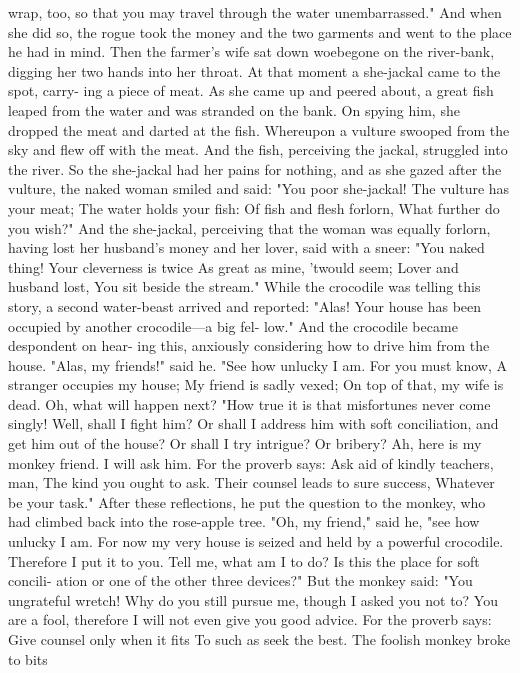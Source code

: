 \documentclass{book}
\begin{document}
wrap, too, so that you may travel through the water
unembarrassed." And when she did so, the rogue
took the money and the two garments and went to
the place he had in mind.
Then the farmer's wife sat down woebegone on
the river-bank, digging her two hands into her throat.
At that moment a she-jackal came to the spot, carry-
ing a piece of meat. As she came up and peered about,
a great fish leaped from the water and was stranded
on the bank. On spying him, she dropped the meat
and darted at the fish. Whereupon a vulture swooped
from the sky and flew off with the meat. And the
fish, perceiving the jackal, struggled into the river.
So the she-jackal had her pains for nothing, and as
she gazed after the vulture, the naked woman smiled
and said:
"You poor she-jackal!
The vulture has your meat;
The water holds your fish:
Of fish and flesh forlorn,
What further do you wish?"
And the she-jackal, perceiving that the woman
was equally forlorn, having lost her husband's money
and her lover, said with a sneer:
"You naked thing!
Your cleverness is twice
As great as mine, 'twould seem;
Lover and husband lost,
You sit beside the stream."
While the crocodile was telling this story, a second
water-beast arrived and reported: "Alas! Your house
has been occupied by another crocodile---a big fel-
low." And the crocodile became despondent on hear-
ing this, anxiously considering how to drive him from
the house. "Alas, my friends!" said he. "See how
unlucky I am. For you must know,
A stranger occupies my house;
My friend is sadly vexed;
On top of that, my wife is dead.
Oh, what will happen next?
"How true it is that misfortunes never come
singly! Well, shall I fight him? Or shall I address
him with soft conciliation, and get him out of the
house? Or shall I try intrigue? Or bribery? Ah,
here is my monkey friend. I will ask him. For the
proverb says:
Ask aid of kindly teachers, man,
The kind you ought to ask.
Their counsel leads to sure success,
Whatever be your task."
After these reflections, he put the question to the
monkey, who had climbed back into the rose-apple
tree. "Oh, my friend," said he, "see how unlucky I
am. For now my very house is seized and held by a
powerful crocodile. Therefore I put it to you. Tell
me, what am I to do? Is this the place for soft concili-
ation or one of the other three devices?"
But the monkey said: "You ungrateful wretch!
Why do you still pursue me, though I asked you not
to? You are a fool, therefore I will not even give
you good advice. For the proverb says:
Give counsel only when it fits
To such as seek the best.
The foolish monkey broke to bits
\end{document}
